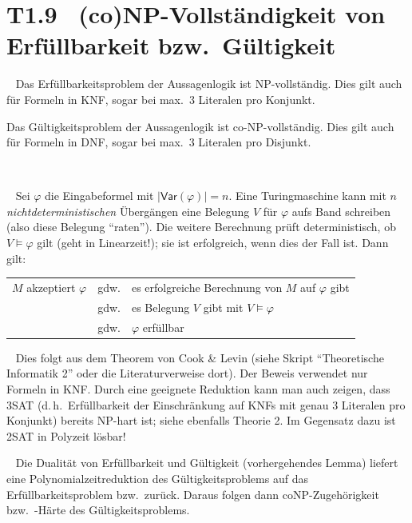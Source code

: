 \documentclass[fontsize=11pt, twoside=false, numbers=autoenddot]{scrbook}
\begin{document}
\section*{T1.9~ (co)NP-Vollständigkeit von Erfüllbarkeit bzw.\ Gültigkeit}

~
Das Erfüllbarkeitsproblem der Aussagenlogik ist NP-voll\-ständig.
Dies gilt auch für Formeln in KNF, sogar bei max.\ 3 Literalen pro Konjunkt.

\par
Das Gültigkeitsproblem der Aussagenlogik ist co-NP-vollständig.
Dies gilt auch für Formeln in DNF, sogar bei max.\ 3 Literalen pro Disjunkt.

\par\smallskip\noindent
\begin{beweis}
  ~\par
  ~
  Sei $\varphi$ die Eingabeformel mit $|\textsf{Var}(\varphi)| = n$.
  Eine Turingmaschine kann mit $n$ \emph{nichtdeterministischen} Übergängen
  eine Belegung $V$ für $\varphi$ aufs Band schreiben (also diese Belegung "`raten"').
  Die weitere Berechnung prüft deterministisch, ob $V \models \varphi$ gilt (geht in Linearzeit!);
  sie ist erfolgreich, wenn dies der Fall ist.
  Dann gilt:
  \begin{center}
    \begin{tabular}{@{}l@{~~}c@{~~}l@{}}
      $M$ akzeptiert $\varphi$ & gdw. & es erfolgreiche Berechnung von $M$ auf $\varphi$ gibt \\
                               & gdw. & es Belegung $V$ gibt mit $V \models \varphi$          \\
                               & gdw. & $\varphi$ erfüllbar
    \end{tabular}
  \end{center}

  \par\medskip
  ~
  Dies folgt aus dem Theorem von Cook \& Levin
  (siehe Skript "`Theoretische Informatik 2"' \cite{SkriptThI} oder die Literaturverweise dort).
  Der Beweis verwendet nur Formeln in KNF.
  Durch eine geeignete Reduktion kann man auch zeigen, dass 3SAT
  (d.\,h.\ Erfüllbarkeit der Einschränkung auf KNFs mit genau 3 Literalen pro Konjunkt)
  bereits NP-hart ist; siehe ebenfalls Theorie 2.
  Im Gegensatz dazu ist 2SAT in Polyzeit lösbar!

  \par\medskip
  ~
  Die Dualität von Erfüllbarkeit und Gültigkeit (vorhergehendes Lemma)
  liefert eine Polynomialzeitreduktion des Gültigkeitsproblems
  auf das Erfüllbarkeitsproblem bzw.\ zurück.
  Daraus folgen dann coNP-Zugehörigkeit bzw.\ -Härte des Gültigkeitsproblems.\qedhere
\end{beweis}%
\end{document}
